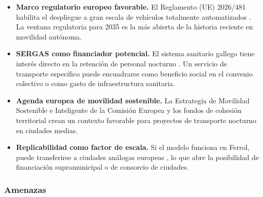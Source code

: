 \begin{itemize}

	\item \textbf{Marco regulatorio europeo favorable.}
	El Reglamento (UE) 2026/481 habilita el despliegue a
	gran escala de vehículos totalmente automatizados
	\parencite{RegUE20262026481}. La ventana regulatoria
	para 2035 es la más abierta de la historia reciente
	en movilidad autónoma.

	\item \textbf{SERGAS como financiador potencial.}
	El sistema sanitario gallego tiene interés directo en
	la retención de personal nocturno \parencite{SERGAS2024memoria}.
	Un servicio de transporte específico puede encuadrarse
	como beneficio social en el convenio colectivo o como
	gasto de infraestructura sanitaria.

	\item \textbf{Agenda europea de movilidad sostenible.}
	La Estrategia de Movilidad Sostenible e Inteligente
	de la Comisión Europea \parencite{CE_Movilidad2020}
	y los fondos de cohesión territorial crean un contexto
	favorable para proyectos de transporte nocturno en
	ciudades medias.

	\item \textbf{Replicabilidad como factor de escala.}
	Si el modelo funciona en Ferrol, puede transferirse a
	ciudades análogas europeas \parencite{URBACTNight2024},
	lo que abre la posibilidad de financiación supramunicipal
	o de consorcio de ciudades.

\end{itemize}

\subsubsection{Amenazas}
\label{sec:dafo-amenazas}

